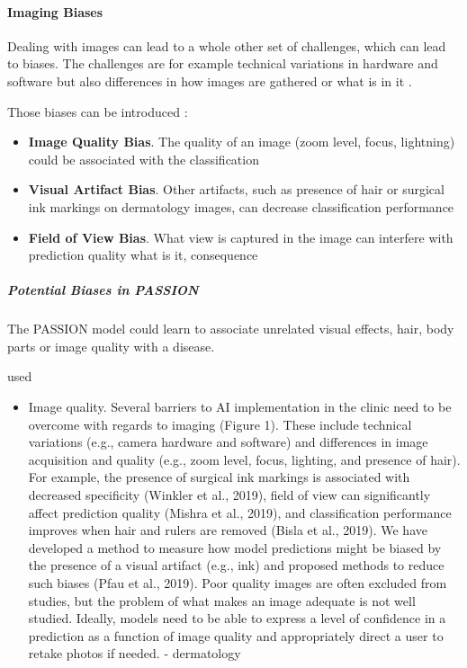 \documentclass[12pt, a4paper, oneside]{book}   	%
\newif\ifrawcitationactive
\newcommand{\rawcitationstart}{\color{purple}\rawcitationactivetrue}
\newcommand{\rawcitationend}{\color{black}\rawcitationactivefalse}
\newcommand{\rawcitationusedstart}{\color{violet}}
\newcommand{\rawcitationusedend}{%
	\ifrawcitationactive
	\color{purple}  %
	\else
	\color{black}  %
	\fi
}
\begin{document}
			
			\paragraph{Imaging Biases}
			Dealing with images can lead to a whole other set of challenges, which can lead to biases. The challenges are for example technical variations in hardware and software but also differences in how images are gathered or what is in it \autocite{Young_2020}.

			Those biases can be introduced :
			\begin{itemize}
				\item \textbf{Image Quality Bias}. The quality of an image (zoom level, focus, lightning) could be associated with the classification \autocite{Young_2020}
				\item \textbf{Visual Artifact Bias}. Other artifacts, such as presence of hair or surgical ink markings on dermatology images, can decrease classification performance \autocite{Winkler et al., 2019 & Bisla et al., 2019 (from Young_2020)}
				\item \textbf{Field of View Bias}. What view is captured in the image can interfere with prediction quality  what is it, consequence \autocite{Mishra et al., 2019 from Young_2020}
			\end{itemize}
			
			
			\subparagraph{Potential Biases in PASSION}
			The PASSION model could learn to associate unrelated visual effects, hair, body parts or image quality with a disease.
			
			
			\rawcitationstart
			used
			\begin{itemize}		
				\rawcitationusedstart
				\item Image quality. Several barriers to AI implementation in the clinic need to be overcome with regards to imaging (Figure 1). These include technical variations (e.g., camera hardware and software) and differences in image acquisition and quality (e.g., zoom level, focus, lighting, and presence of hair). For example, the presence of surgical ink markings is associated with decreased specificity (Winkler et al., 2019), field of view can significantly affect prediction quality (Mishra et al., 2019), and classification performance improves when hair and rulers are removed (Bisla et al., 2019). We have developed a method to measure how model predictions might be biased by the presence of a visual artifact (e.g., ink) and proposed methods to reduce such biases (Pfau et al., 2019). Poor quality images are often excluded from studies, but the problem of what makes an image adequate is not well studied. Ideally, models need to be able to express a level of confidence in a prediction as a function of image quality and appropriately direct a user to retake photos if needed. \autocite{Young_2020} - dermatology
				\rawcitationusedend
			\end{itemize}
			\rawcitationend
			
\end{document}
